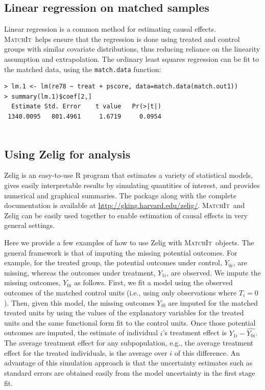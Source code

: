 \documentclass[oneside,letterpaper,titlepage]{article}
\newcommand{\MatchIt}{\textsc{MatchIt}}
\begin{document}
\subsection{Linear regression on matched samples}
\label{linreg}
Linear regression is a common method for estimating causal effects.
\MatchIt\ helps ensure that the regression is done using treated and
control groups with similar covariate distributions, thus reducing
reliance on the linearity assumption and extrapolation.  The ordinary
least squares regression can be fit to the matched data, using the
{\tt match.data} function:

\begin{verbatim}
> lm.1 <- lm(re78 ~ treat + pscore, data=match.data(match.out1))
> summary(lm.1)$coef[2,]
  Estimate Std. Error    t value   Pr(>|t|)
 1340.0095   801.4961     1.6719     0.0954


\end{verbatim} 

\subsection{Using Zelig for analysis}
Zelig is an easy-to-use R program that estimates a variety of statistical
models, gives easily interpretable results by simulating quantities of
interest, and provides numerical and graphical summaries.  The package
along with the complete documentation is available at
\href{http://gking.harvard.edu/zelig/}{http://gking.harvard.edu/zelig/}.
\MatchIt\ and Zelig can be easily used together to enable estimation
of causal effects in very general settings.

Here we provide a few examples of how to use Zelig with \MatchIt\ 
objects.  The general framework is that of imputing the missing
potential outcomes.  For example, for the treated group, the potential
outcomes under control, $Y_{0i}$, are missing, whereas the outcomes
under treatment, $Y_{1i}$, are observed.  We impute the missing
outcomes, $Y_{0i}$ as follows.  First, we fit a model using the
observed outcomes of the matched control units (i.e., using only
observations where $T_i=0$).  Then, given this model, the missing
outcomes $Y_{i0}$ are imputed for the matched treated units by using
the values of the explanatory variables for the treated units and the
same functional form fit to the control units.  Once those potential
outcomes are imputed, the estimate of individual $i$'s treatment
effect is $Y_{1i}-\widehat{Y_{0i}}$.  The average treatment effect for
any subpopulation, e.g., the average treatment effect for the treated
individuals, is the average over $i$ of this difference. An advantage
of this simulation approach is that the uncertainty estimates such as
standard errors are obtained easily from the model uncertainty in the
first stage fit.
\end{document}
